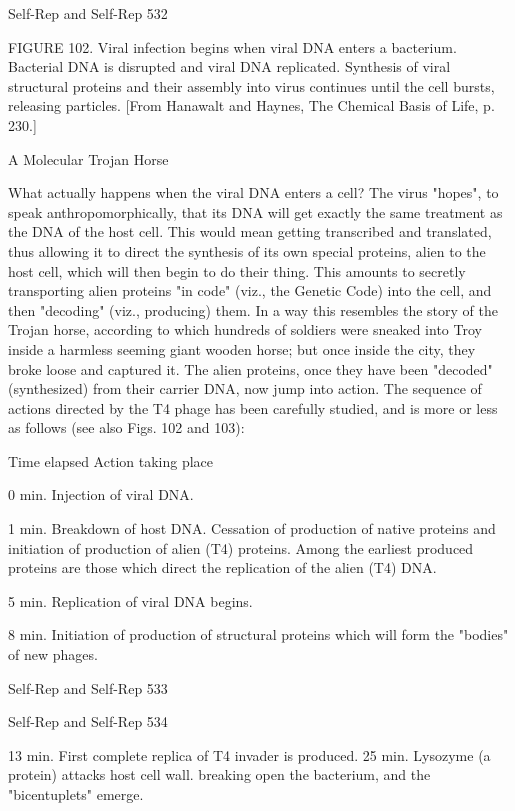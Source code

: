 {Self-Rep and Self-Rep                                                                         532

FIGURE 102. Viral infection begins when viral DNA enters a bacterium. Bacterial DNA is
disrupted and viral DNA replicated. Synthesis of viral structural proteins and their assembly
into virus continues until the cell bursts, releasing particles. [From Hanawalt and Haynes,
The Chemical Basis of Life, p. 230.]

                                 A Molecular Trojan Horse

What actually happens when the viral DNA enters a cell? The virus "hopes", to speak
anthropomorphically, that its DNA will get exactly the same treatment as the DNA of the
host cell. This would mean getting transcribed and translated, thus allowing it to direct the
synthesis of its own special proteins, alien to the host cell, which will then begin to do their
thing. This amounts to secretly transporting alien proteins "in code" (viz., the Genetic Code)
into the cell, and then "decoding" (viz., producing) them. In a way this resembles the story of
the Trojan horse, according to which hundreds of soldiers were sneaked into Troy inside a
harmless seeming giant wooden horse; but once inside the city, they broke loose and captured
it. The alien proteins, once they have been "decoded" (synthesized) from their carrier DNA,
now jump into action. The sequence of actions directed by the T4 phage has been carefully
studied, and is more or less as follows (see also Figs. 102 and 103):

Time elapsed Action taking place

0 min.         Injection of viral DNA.

1 min.         Breakdown of host DNA. Cessation of production of native proteins and
               initiation of production of alien (T4) proteins. Among the earliest produced
               proteins are those which direct the replication of the alien (T4) DNA.

5 min.         Replication of viral DNA begins.

8 min.         Initiation of production of structural proteins which will form the "bodies" of
               new phages.




Self-Rep and Self-Rep                                                                       533

Self-Rep and Self-Rep   534

13 min.         First complete replica of T4 invader is produced.
25 min.         Lysozyme (a protein) attacks host cell wall. breaking open the bacterium, and
                the "bicentuplets" emerge.

}
